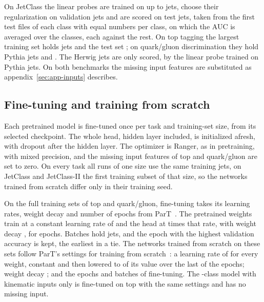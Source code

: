 On JetClass the linear probes are trained on up to \LpNTrainMaxJci{} jets, choose their regularization on
\LpNValJci{} validation jets and are scored on \LpNTestJci{} test jets, taken from the first test files of
each class with equal numbers per class, on which the AUC is averaged over the classes, each against the rest. On top tagging the largest training set holds \LpNTrainMaxTop{} jets and the test set
\LpNTestTop; on quark/gluon discrimination they hold \LpNTrainMaxQg{} Pythia jets and \LpNTestQg. The Herwig
jets are only scored, by the linear probe trained on Pythia jets. On both benchmarks the missing input
features are substituted as appendix~\ref{sec:app-inputs} describes.

\subsection{Fine-tuning and training from scratch}\label{sec:app-ft}

Each pretrained model is fine-tuned once per task and training-set size, from its selected checkpoint.
The whole head, hidden layer included, is initialized afresh, with dropout \MlstFtHeadDropout{} after the
hidden layer. The optimizer is Ranger, as in pretraining, with mixed precision, and the missing
input features of top and quark/gluon are set to zero. On every task all runs of one size use the same
training jets, on JetClass and JetClass-II the first training subset of that size, so the
\MlstFtRefSeedsWord{} networks trained from scratch differ only in their training seed.

On the full training sets of top and quark/gluon, fine-tuning takes its learning rates, weight decay
and number of epochs from ParT~\cite[Sec.~5.2]{part}. The pretrained weights train at a constant
learning rate of \MlstFtLr{} and the head at \MlstFtHeadMult{} times that rate, with weight decay
\MlstFtWeightDecay{}, for \MlstFtBenchEpochs{} epochs. Batches hold \MlstFtBatch{} jets, and the epoch
with the highest validation accuracy is kept, the earliest in a tie. The networks trained from scratch on these sets follow ParT's settings for
training from scratch~\cite[Secs.~5.1 and~5.2]{part}: a learning rate of \MlstFtRefLr{} for every weight,
constant and then lowered to \MlstFtHeadDecayTo{} of its value over the last \MlstFtHeadDecayShare{} of the
epochs; weight decay \MlstFtRefWeightDecayBench; and the epochs and batches of fine-tuning. The \Kfull-class model with kinematic inputs only is fine-tuned
on top with the same settings and has no missing input.

